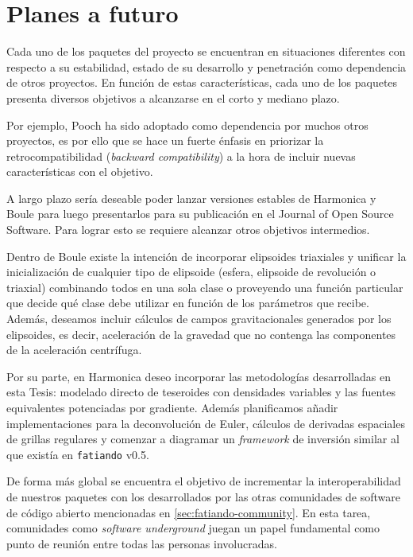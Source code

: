 \section{Planes a futuro}

Cada uno de los paquetes del proyecto se encuentran en situaciones diferentes
con respecto a su estabilidad, estado de su desarrollo y penetración como
dependencia de otros proyectos.
En función de estas características, cada uno de los paquetes presenta diversos
objetivos a alcanzarse en el corto y mediano plazo.

Por ejemplo, Pooch ha sido adoptado como dependencia por muchos otros
proyectos, es por ello que se hace un fuerte énfasis en priorizar la
retrocompatibilidad (\emph{backward compatibility}) a la hora de incluir nuevas
características con el objetivo.

A largo plazo sería deseable poder lanzar versiones estables de Harmonica
y Boule para luego presentarlos para su publicación en el Journal of Open
Source Software.
Para lograr esto se requiere alcanzar otros objetivos intermedios.

Dentro de Boule existe la intención de incorporar elipsoides triaxiales
y unificar la inicialización de cualquier tipo de elipsoide (esfera, elipsoide
de revolución o triaxial) combinando todos en una sola clase o proveyendo una
función particular que decide qué clase debe utilizar en función de los
parámetros que recibe.
Además, deseamos incluir cálculos de campos gravitacionales generados por los
elipsoides, es decir, aceleración de la gravedad que no contenga las
componentes de la aceleración centrífuga.

Por su parte, en Harmonica deseo incorporar las metodologías desarrolladas
en esta Tesis: modelado directo de teseroides con densidades variables y las
fuentes equivalentes potenciadas por gradiente.
Además planificamos añadir implementaciones para la deconvolución de Euler,
cálculos de derivadas espaciales de grillas regulares y comenzar a diagramar un
\emph{framework} de inversión similar al que existía en \texttt{fatiando} v0.5.

De forma más global se encuentra el objetivo de incrementar la
interoperabilidad de nuestros paquetes con los desarrollados por las otras
comunidades de software de código abierto mencionadas en
\ref{sec:fatiando-community}.
En esta tarea, comunidades como \emph{software underground} juegan un papel
fundamental como punto de reunión entre todas las personas involucradas.








